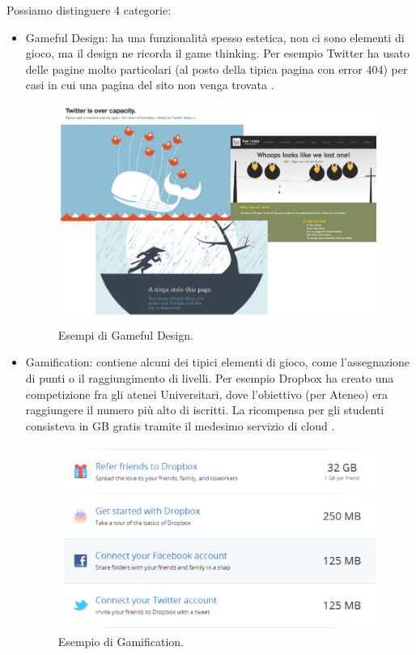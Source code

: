 Possiamo distinguere 4 categorie:

\begin{itemize}
\item Gameful Design: ha una funzionalità spesso estetica, non ci sono elementi di gioco, ma il design ne ricorda il game thinking. Per esempio Twitter ha usato delle pagine molto particolari (al posto della tipica pagina con error 404) per casi in cui una pagina del sito non venga trovata \myfig{\ref{fig:gamefuldesignex}}.

\begin{figure}[h]
\centerline{\includegraphics[scale=0.35]{images/statoarte/gamefuldesignex.png}}
\caption{Esempi di Gameful Design.}
\label{fig:gamefuldesignex}
\end{figure}

\item Gamification: contiene alcuni dei tipici elementi di gioco, come l'assegnazione di punti o il raggiungimento di livelli. Per esempio Dropbox ha creato una competizione fra gli atenei Universitari, dove l'obiettivo (per Ateneo) era raggiungere il numero più alto di iscritti. La ricompensa per gli studenti consisteva in GB gratis tramite il medesimo servizio di cloud \myfig{\ref{fig:gamefuldesignex}}.

\begin{figure}[b]
\centerline{\includegraphics[scale=0.3]{images/statoarte/gamificationex.png}}
\caption{Esempio di Gamification.}
\label{fig:gamificationex}
\end{figure}


\end{itemize}

